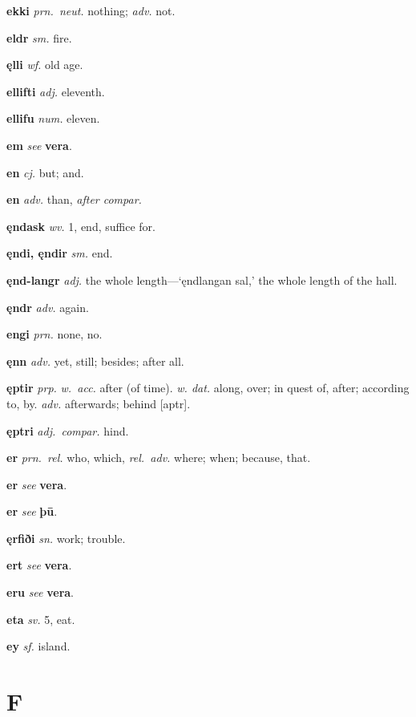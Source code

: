 \documentclass[12pt,letterpaper]{book}
\newcommand\emptypage{\clearpage{\pagestyle{empty}\cleardoublepage}}
\begin{document}
\noindent
\textbf{ekki} \textit{prn.\ neut.} nothing; \textit{adv.} not.

\noindent
\textbf{eldr} \textit{sm.} fire.

\noindent
\textbf{ęlli} \textit{wf.} old age.

\noindent
\textbf{ellifti} \textit{adj.} eleventh.

\noindent
\textbf{ellifu} \textit{num.} eleven.

\noindent
\textbf{em} \textit{} \textit{see} \textbf{vera}.

\noindent
\textbf{en} \textit{cj.} but; and.

\noindent
\textbf{en} \textit{adv.} than, \textit{after compar.}

\noindent
\textbf{ęndask} \textit{wv.} 1, end, suffice for.

\noindent
\textbf{ęndi, ęndir} \textit{sm.} end.

\noindent
\textbf{ęnd-langr} \textit{adj.} the whole length---`ęndlangan sal,' the
	whole length of the hall.

\noindent
\textbf{ęndr} \textit{adv.} again.

\noindent
\textbf{engi} \textit{prn.} none, no.

\noindent
\textbf{ęnn} \textit{adv.} yet, still; besides; after all.

\noindent
\textbf{ęptir} \textit{prp.} \textit{w.\ acc.} after (of time).  \textit{w.
	dat.} along, over; in quest of, after; according to, by.
	\textit{adv.} afterwards; behind [aptr].

\noindent
\textbf{ęptri} \textit{adj.\ compar.} hind.

\noindent
\textbf{er} \textit{prn.\ rel.} who, which, \textit{rel.\ adv.} where;
	when; because, that.

\noindent
\textbf{er} \textit{} \textit{see} \textbf{vera}.

\noindent
\textbf{er} \textit{} \textit{see} \textbf{þū}.

\noindent
\textbf{ęrfiði} \textit{sn.} work; trouble.

\noindent
\textbf{ert} \textit{} \textit{see} \textbf{vera}.

\noindent
\textbf{eru} \textit{} \textit{see} \textbf{vera}.

\noindent
\textbf{eta} \textit{sv.} 5, eat.

\noindent
\textbf{ey} \textit{sf.} island.

\emptypage

\chapter*{F}
\end{document}
